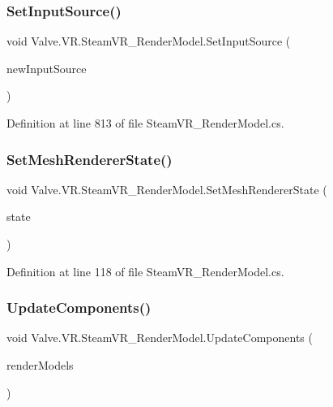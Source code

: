 \subsubsection{\texorpdfstring{SetInputSource()}{SetInputSource()}}
{\footnotesize\ttfamily void Valve.\+V\+R.\+Steam\+V\+R\+\_\+\+Render\+Model.\+Set\+Input\+Source (\begin{DoxyParamCaption}\item[{\mbox{\hyperlink{namespace_valve_1_1_v_r_a82e5bf501cc3aa155444ee3f0662853f}{Steam\+V\+R\+\_\+\+Input\+\_\+\+Sources}}}]{new\+Input\+Source }\end{DoxyParamCaption})}



Definition at line 813 of file Steam\+V\+R\+\_\+\+Render\+Model.\+cs.

\mbox{\label{class_valve_1_1_v_r_1_1_steam_v_r___render_model_a251a4e0e082f7e54e6976ac0f2beb16c}} 
\subsubsection{\texorpdfstring{SetMeshRendererState()}{SetMeshRendererState()}}
{\footnotesize\ttfamily void Valve.\+V\+R.\+Steam\+V\+R\+\_\+\+Render\+Model.\+Set\+Mesh\+Renderer\+State (\begin{DoxyParamCaption}\item[{bool}]{state }\end{DoxyParamCaption})}



Definition at line 118 of file Steam\+V\+R\+\_\+\+Render\+Model.\+cs.

\mbox{\label{class_valve_1_1_v_r_1_1_steam_v_r___render_model_a4fec96fa73075ae8c809bfeaa6c95aab}} 
\subsubsection{\texorpdfstring{UpdateComponents()}{UpdateComponents()}}
{\footnotesize\ttfamily void Valve.\+V\+R.\+Steam\+V\+R\+\_\+\+Render\+Model.\+Update\+Components (\begin{DoxyParamCaption}\item[{\mbox{\hyperlink{class_valve_1_1_v_r_1_1_c_v_r_render_models}{C\+V\+R\+Render\+Models}}}]{render\+Models }\end{DoxyParamCaption})}



